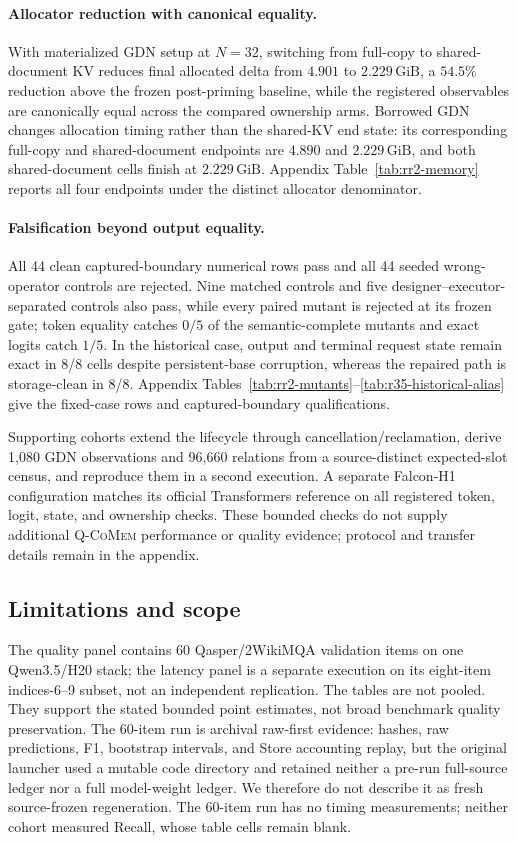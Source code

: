 \documentclass{article}
\newcommand{\qcomem}{\textsc{Q-CoMem}}
\newcommand{\gib}{\,\mathrm{GiB}}
\begin{document}
\paragraph{Allocator reduction with canonical equality.}
With materialized GDN setup at $N=32$, switching from full-copy to
shared-document KV reduces final allocated delta from $4.901$ to $2.229\gib$,
a $54.5\%$ reduction above the frozen post-priming baseline, while the
registered observables are canonically equal across the compared ownership
arms.  Borrowed GDN changes allocation timing
rather than the shared-KV end state: its corresponding full-copy and
shared-document endpoints are $4.890$ and $2.229\gib$, and both shared-document
cells finish at $2.229\gib$.  Appendix Table~\ref{tab:rr2-memory} reports all
four endpoints under the distinct allocator denominator.

\paragraph{Falsification beyond output equality.}
All 44 clean captured-boundary numerical rows pass and all 44 seeded
wrong-operator controls are rejected.  Nine matched controls and five
designer--executor-separated controls also pass, while every paired mutant is
rejected at its frozen gate; token equality catches $0/5$ of the semantic-complete
mutants and exact logits catch $1/5$.  In the historical case, output and
terminal request state remain exact in 8/8 cells despite persistent-base
corruption, whereas the repaired path is storage-clean in 8/8.  Appendix
Tables~\ref{tab:rr2-mutants}--\ref{tab:r35-historical-alias} give the fixed-case
rows and captured-boundary qualifications.

Supporting cohorts extend the lifecycle through cancellation/reclamation,
derive 1,080 GDN observations and 96,660 relations from a source-distinct
expected-slot census, and reproduce them in a second execution.  A separate
Falcon-H1 configuration matches its official Transformers reference on all
registered token, logit, state, and ownership checks.  These bounded checks do
not supply additional \qcomem{} performance or quality evidence; protocol and
transfer details remain in the appendix.

\subsection{Limitations and scope}
\label{sec:limitations}

The quality panel contains 60 Qasper/2WikiMQA validation items on one
Qwen3.5/H20 stack; the latency panel is a separate execution on its eight-item
indices-6--9 subset, not an independent replication.  The tables are not
pooled.  They support the stated bounded point estimates, not broad benchmark
quality preservation.  The
60-item run is archival raw-first evidence: hashes, raw predictions, F1,
bootstrap intervals, and Store accounting replay, but the original launcher
used a mutable code directory and retained neither a pre-run full-source ledger
nor a full model-weight ledger.  We therefore do not describe it as fresh
source-frozen regeneration.  The 60-item run has no timing measurements; neither
cohort measured Recall, whose table cells remain blank.
\end{document}
